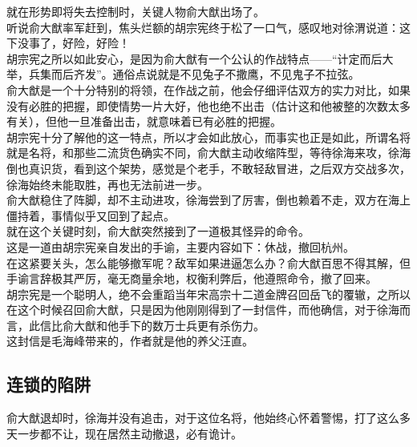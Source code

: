 \begin{multicols}{\theparacolNo}
就在形势即将失去控制时，关键人物俞大猷出场了。\\

听说俞大猷率军赶到，焦头烂额的胡宗宪终于松了一口气，感叹地对徐渭说道：这下没事了，好险，好险！\\

胡宗宪之所以如此安心，是因为俞大猷有一个公认的作战特点——“计定而后大举，兵集而后齐发”。通俗点说就是不见兔子不撒鹰，不见鬼子不拉弦。\\

俞大猷是一个十分特别的将领，在作战之前，他会仔细评估双方的实力对比，如果没有必胜的把握，即使情势一片大好，他也绝不出击（估计这和他被整的次数太多有关），但他一旦准备出击，就意味着已有必胜的把握。\\

胡宗宪十分了解他的这一特点，所以才会如此放心，而事实也正是如此，所谓名将就是名将，和那些二流货色确实不同，俞大猷主动收缩阵型，等待徐海来攻，徐海倒也真识货，看到这个架势，感觉是个老手，不敢轻敌冒进，之后双方交战多次，徐海始终未能取胜，再也无法前进一步。\\

俞大猷稳住了阵脚，却不主动进攻，徐海尝到了厉害，倒也赖着不走，双方在海上僵持着，事情似乎又回到了起点。\\

就在这个关键时刻，俞大猷突然接到了一道极其怪异的命令。\\

这是一道由胡宗宪亲自发出的手谕，主要内容如下：休战，撤回杭州。\\

在这紧要关头，怎么能够撤军呢？敌军如果进逼怎么办？俞大猷百思不得其解，但手谕言辞极其严厉，毫无商量余地，权衡利弊后，他遵照命令，撤了回来。\\

胡宗宪是一个聪明人，绝不会重蹈当年宋高宗十二道金牌召回岳飞的覆辙，之所以在这个时候召回俞大猷，只是因为他刚刚得到了一封信件，而他确信，对于徐海而言，此信比俞大猷和他手下的数万士兵更有杀伤力。\\

这封信是毛海峰带来的，作者就是他的养父汪直。\\

\subsection{连锁的陷阱}
俞大猷退却时，徐海并没有追击，对于这位名将，他始终心怀着警惕，打了这么多天一步都不让，现在居然主动撤退，必有诡计。\\


\end{multicols}
